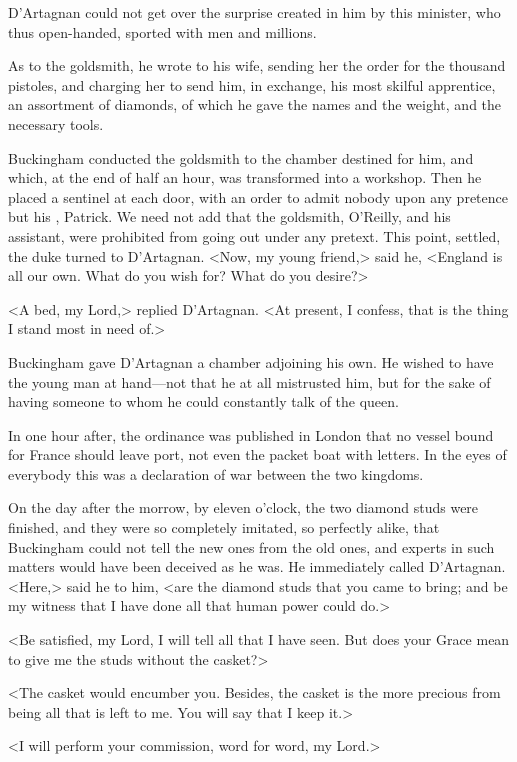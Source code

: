D'Artagnan could not get over the surprise created in him by this minister, who thus open-handed, sported with men and millions. 

As to the goldsmith, he wrote to his wife, sending her the order for the thousand pistoles, and charging her to send him, in exchange, his most skilful apprentice, an assortment of diamonds, of which he gave the names and the weight, and the necessary tools. 

Buckingham conducted the goldsmith to the chamber destined for him, and which, at the end of half an hour, was transformed into a workshop. Then he placed a sentinel at each door, with an order to admit nobody upon any pretence but his , Patrick. We need not add that the goldsmith, O'Reilly, and his assistant, were prohibited from going out under any pretext. This point, settled, the duke turned to D'Artagnan. <Now, my young friend,> said he, <England is all our own. What do you wish for? What do you desire?> 

<A bed, my Lord,> replied D'Artagnan. <At present, I confess, that is the thing I stand most in need of.> 

Buckingham gave D'Artagnan a chamber adjoining his own. He wished to have the young man at hand—not that he at all mistrusted him, but for the sake of having someone to whom he could constantly talk of the queen. 

In one hour after, the ordinance was published in London that no vessel bound for France should leave port, not even the packet boat with letters. In the eyes of everybody this was a declaration of war between the two kingdoms. 

On the day after the morrow, by eleven o'clock, the two diamond studs were finished, and they were so completely imitated, so perfectly alike, that Buckingham could not tell the new ones from the old ones, and experts in such matters would have been deceived as he was. He immediately called D'Artagnan. <Here,> said he to him, <are the diamond studs that you came to bring; and be my witness that I have done all that human power could do.> 

<Be satisfied, my Lord, I will tell all that I have seen. But does your Grace mean to give me the studs without the casket?> 

<The casket would encumber you. Besides, the casket is the more precious from being all that is left to me. You will say that I keep it.> 

<I will perform your commission, word for word, my Lord.> 

